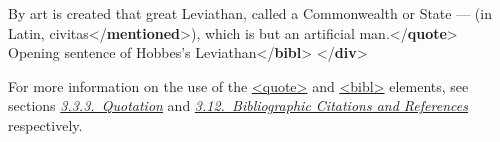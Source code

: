 \begin{shaded}
\hspace*{1em}\mbox{}\newline 
\hspace*{1em}\mbox{}\newline 
\hspace*{1em}\hspace*{1em}By art is created that great Leviathan,\mbox{}\newline 
\hspace*{1em}\hspace*{1em}\hspace*{1em}\hspace*{1em}\hspace*{1em}\hspace*{1em} called a Commonwealth or State — (in Latin,\mbox{}\newline 
\hspace*{1em}\hspace*{1em}civitas{</\textbf{mentioned}>}), which\mbox{}\newline 
\hspace*{1em}\hspace*{1em}\hspace*{1em}\hspace*{1em}\hspace*{1em}\hspace*{1em} is but an artificial man.{</\textbf{quote}>}\mbox{}\newline 
\hspace*{1em}\hspace*{1em}Opening sentence of Hobbes's Leviathan{</\textbf{bibl}>}\mbox{}\newline 
\hspace*{1em}\mbox{}\newline 
{}\mbox{}\newline 
{</\textbf{div}>}\end{shaded}\egroup\par \noindent  For more information on the use of the \hyperref[TEI.quote]{<quote>} and \hyperref[TEI.bibl]{<bibl>} elements, see sections \textit{\hyperref[COHQQ]{3.3.3.\ Quotation}} and \textit{\hyperref[COBI]{3.12.\ Bibliographic Citations and References}} respectively.
